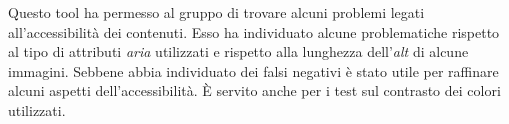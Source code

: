 Questo tool ha permesso al gruppo di trovare alcuni problemi legati all'accessibilità dei contenuti. Esso ha individuato alcune problematiche rispetto al tipo di attributi \textit{aria} utilizzati e rispetto alla lunghezza dell'\textit{alt} di alcune immagini. Sebbene abbia individuato dei falsi negativi è stato utile per raffinare alcuni aspetti dell'accessibilità. È servito anche per i test sul contrasto dei colori utilizzati.\\
